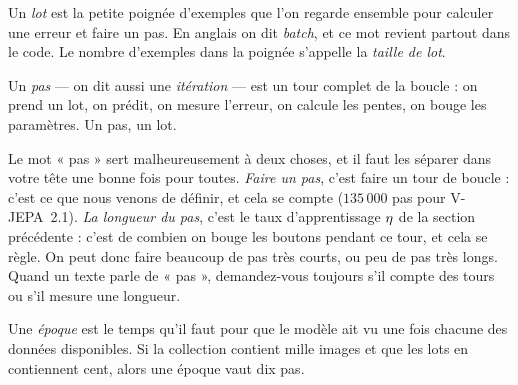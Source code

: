 \begin{definition}[Le lot][lot]
Un \emph{lot} est la petite poignée d'exemples que l'on regarde ensemble
pour calculer une erreur et faire un pas. En anglais on dit \emph{batch}, et
ce mot revient partout dans le code. Le nombre d'exemples dans la poignée
s'appelle la \emph{taille de lot}.
\end{definition}

\begin{definition}
Un \emph{pas} — on dit aussi une \emph{itération} — est un tour complet de
la boucle : on prend un lot, on prédit, on mesure l'erreur, on calcule les
pentes, on bouge les paramètres. Un pas, un lot.
\end{definition}

\begin{piege}
Le mot « pas » sert malheureusement à deux choses, et il faut les séparer
dans votre tête une bonne fois pour toutes. \emph{Faire un pas}, c'est faire
un tour de boucle : c'est ce que nous venons de définir, et cela se compte
($135\,000$ pas pour V-JEPA~2.1). \emph{La longueur du pas}, c'est le taux
d'apprentissage $\eta$ de la section précédente : c'est de combien on bouge
les boutons pendant ce tour, et cela se règle. On peut donc faire beaucoup
de pas très courts, ou peu de pas très longs. Quand un texte parle de
« pas », demandez-vous toujours s'il compte des tours ou s'il mesure une
longueur.
\end{piege}

\begin{definition}[L'époque][epoque]
Une \emph{époque} est le temps qu'il faut pour que le modèle ait vu une fois
chacune des données disponibles. Si la collection contient mille images et
que les lots en contiennent cent, alors une époque vaut dix pas.
\end{definition}

